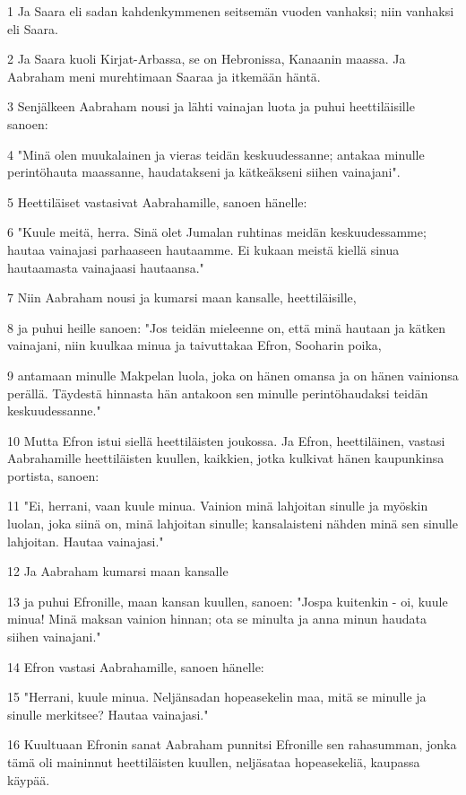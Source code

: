 \par 1 Ja Saara eli sadan kahdenkymmenen seitsemän vuoden vanhaksi; niin vanhaksi eli Saara.
\par 2 Ja Saara kuoli Kirjat-Arbassa, se on Hebronissa, Kanaanin maassa. Ja Aabraham meni murehtimaan Saaraa ja itkemään häntä.
\par 3 Senjälkeen Aabraham nousi ja lähti vainajan luota ja puhui heettiläisille sanoen:
\par 4 "Minä olen muukalainen ja vieras teidän keskuudessanne; antakaa minulle perintöhauta maassanne, haudatakseni ja kätkeäkseni siihen vainajani".
\par 5 Heettiläiset vastasivat Aabrahamille, sanoen hänelle:
\par 6 "Kuule meitä, herra. Sinä olet Jumalan ruhtinas meidän keskuudessamme; hautaa vainajasi parhaaseen hautaamme. Ei kukaan meistä kiellä sinua hautaamasta vainajaasi hautaansa."
\par 7 Niin Aabraham nousi ja kumarsi maan kansalle, heettiläisille,
\par 8 ja puhui heille sanoen: "Jos teidän mieleenne on, että minä hautaan ja kätken vainajani, niin kuulkaa minua ja taivuttakaa Efron, Sooharin poika,
\par 9 antamaan minulle Makpelan luola, joka on hänen omansa ja on hänen vainionsa perällä. Täydestä hinnasta hän antakoon sen minulle perintöhaudaksi teidän keskuudessanne."
\par 10 Mutta Efron istui siellä heettiläisten joukossa. Ja Efron, heettiläinen, vastasi Aabrahamille heettiläisten kuullen, kaikkien, jotka kulkivat hänen kaupunkinsa portista, sanoen:
\par 11 "Ei, herrani, vaan kuule minua. Vainion minä lahjoitan sinulle ja myöskin luolan, joka siinä on, minä lahjoitan sinulle; kansalaisteni nähden minä sen sinulle lahjoitan. Hautaa vainajasi."
\par 12 Ja Aabraham kumarsi maan kansalle
\par 13 ja puhui Efronille, maan kansan kuullen, sanoen: "Jospa kuitenkin - oi, kuule minua! Minä maksan vainion hinnan; ota se minulta ja anna minun haudata siihen vainajani."
\par 14 Efron vastasi Aabrahamille, sanoen hänelle:
\par 15 "Herrani, kuule minua. Neljänsadan hopeasekelin maa, mitä se minulle ja sinulle merkitsee? Hautaa vainajasi."
\par 16 Kuultuaan Efronin sanat Aabraham punnitsi Efronille sen rahasumman, jonka tämä oli maininnut heettiläisten kuullen, neljäsataa hopeasekeliä, kaupassa käypää.
